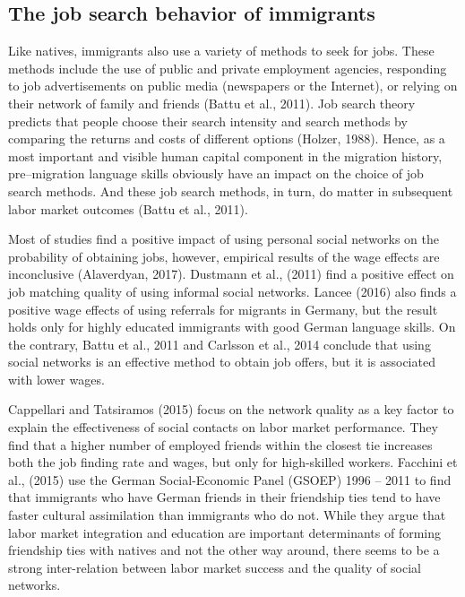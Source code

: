 \documentclass[12pt,a4paper]{article}
\begin{document}
\subsection{The job search behavior of immigrants}

Like natives, immigrants also use a variety of methods to seek for jobs. These methods include the use of public and private employment agencies, responding to job advertisements on public media (newspapers or the Internet), or relying on their network of family and friends (Battu et al., 2011). Job search theory predicts that people choose their search intensity and search methods by comparing the returns and costs of different options (Holzer, 1988). Hence, as a most important and visible human capital component in the migration history, pre--migration language skills obviously have an impact on the choice of job search methods. And these job search methods, in turn, do matter in subsequent labor market outcomes (Battu et al., 2011).

Most of studies find a positive impact of using personal social networks on the probability of obtaining jobs, however, empirical results of the wage effects are inconclusive (Alaverdyan, 2017). Dustmann et al., (2011) find a positive effect on job matching quality of using informal social networks. Lancee (2016) also finds a positive wage effects of using referrals for migrants in Germany, but the result holds only for highly educated immigrants with good German language skills. On the contrary, Battu et al., 2011 and Carlsson et al., 2014 conclude that using social networks is an effective method to obtain job offers, but it is associated with lower wages. 

Cappellari and Tatsiramos (2015) focus on the network quality as a key factor to explain the effectiveness of social contacts on labor market performance. They find that a higher number of employed friends within the closest tie increases both the job finding rate and wages, but only for high-skilled workers. Facchini et al., (2015) use the German Social-Economic Panel (GSOEP) 1996 -- 2011 to find that immigrants who have German friends in their friendship ties tend to have faster cultural assimilation than immigrants who do not. While they argue that labor market integration and education are important determinants of forming friendship ties with natives and not the other way around, there seems to be a strong inter-relation between labor market success and the quality of social networks.

\end{document}
